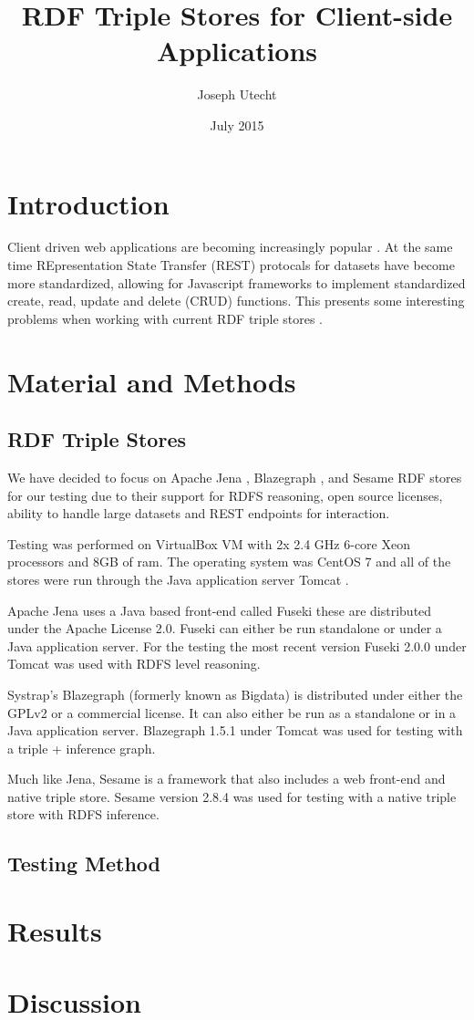 \documentclass{article}
\title{RDF Triple Stores for Client-side Applications}
\author{Joseph Utecht}
\date{July 2015}
\begin{document}
\maketitle
\section{Introduction}

Client driven web applications are becoming increasingly popular \cite{Fielding2000}.  At the same time REpresentation State Transfer (REST) protocals for datasets have become more standardized, allowing for Javascript frameworks to implement standardized create, read, update and delete (CRUD) functions.  This presents some interesting problems when working with current RDF triple stores \cite{Battle2008}.

\section{Material and Methods}
\subsection{RDF Triple Stores}

We have decided to focus on Apache Jena \cite{Jena}, Blazegraph \cite{Blazegraph}, and Sesame \cite{Sesame} RDF stores for our testing due to their support for RDFS reasoning, open source licenses, ability to handle large datasets and REST endpoints for interaction. \cite{Voigt2012}

Testing was performed on VirtualBox VM \cite{Virtualbox} with 2x 2.4 GHz 6-core Xeon processors and 8GB of ram.  The operating system was CentOS 7 \cite{Centos} and all of the stores were run through the Java application server Tomcat \cite{Tomcat}.

Apache Jena uses a Java based front-end called Fuseki these are distributed under the Apache License 2.0.  Fuseki can either be run standalone or under a Java application server.  For the testing the most recent version Fuseki 2.0.0 under Tomcat was used with RDFS level reasoning.

Systrap's Blazegraph (formerly known as Bigdata) is distributed under either the GPLv2 or a commercial license.  It can also either be run as a standalone or in a Java application server.  Blazegraph 1.5.1 under Tomcat was used for testing with a triple + inference graph.

Much like Jena, Sesame is a framework that also includes a web front-end and native triple store.  Sesame version 2.8.4 was used for testing with a native triple store with RDFS inference.

\subsection{Testing Method}

\section{Results}

\section{Discussion}



\end{document}
